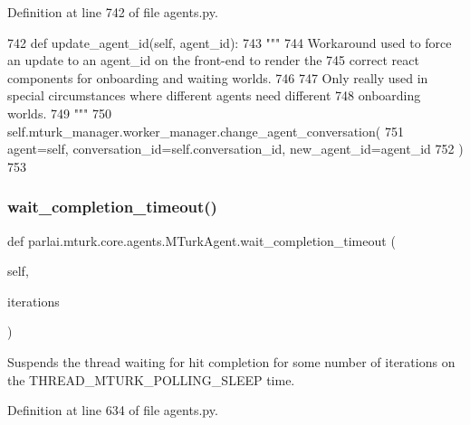 Definition at line 742 of file agents.\+py.


\begin{DoxyCode}
742     \textcolor{keyword}{def }update\_agent\_id(self, agent\_id):
743         \textcolor{stringliteral}{"""}
744 \textcolor{stringliteral}{        Workaround used to force an update to an agent\_id on the front-end to render the}
745 \textcolor{stringliteral}{        correct react components for onboarding and waiting worlds.}
746 \textcolor{stringliteral}{}
747 \textcolor{stringliteral}{        Only really used in special circumstances where different agents need different}
748 \textcolor{stringliteral}{        onboarding worlds.}
749 \textcolor{stringliteral}{        """}
750         self.mturk\_manager.worker\_manager.change\_agent\_conversation(
751             agent=self, conversation\_id=self.conversation\_id, new\_agent\_id=agent\_id
752         )
753 \end{DoxyCode}
\mbox{\label{classparlai_1_1mturk_1_1core_1_1agents_1_1MTurkAgent_a16eafd62a6d60317de9098405f786180}} 
\subsubsection{\texorpdfstring{wait\+\_\+completion\+\_\+timeout()}{wait\_completion\_timeout()}}
{\footnotesize\ttfamily def parlai.\+mturk.\+core.\+agents.\+M\+Turk\+Agent.\+wait\+\_\+completion\+\_\+timeout (\begin{DoxyParamCaption}\item[{}]{self,  }\item[{}]{iterations }\end{DoxyParamCaption})}

\begin{DoxyVerb}Suspends the thread waiting for hit completion for some number of iterations on
the THREAD_MTURK_POLLING_SLEEP time.
\end{DoxyVerb}
 

Definition at line 634 of file agents.\+py.


